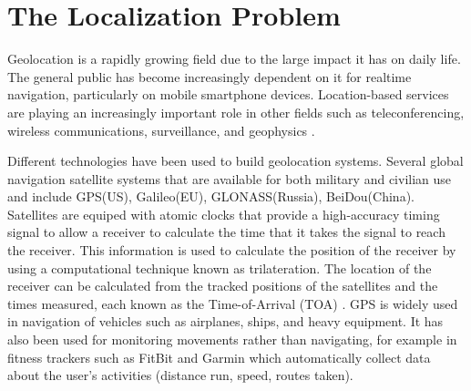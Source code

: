 \label{chapter:introduction}



\section{The Localization Problem} \label{problem}

Geolocation is a rapidly growing field due to the large impact it has on daily life.  The general public has become increasingly dependent on it for realtime navigation, particularly on mobile smartphone devices. Location-based services are  playing an increasingly important role in other fields such as teleconferencing, wireless communications, surveillance, and geophysics \cite{SmithAbel, ShcauRob, Yao, Huang, CheungChan, LiHu, Cheung, Sayed, classMDS}.

Different technologies have been used to build geolocation systems. Several global navigation satellite systems that are available for both military and civilian use and include GPS(US), Galileo(EU), GLONASS(Russia), BeiDou(China). Satellites are equiped with atomic clocks that provide a high-accuracy timing signal to  allow a receiver to calculate the time that it takes the signal to reach the receiver. This information is used to calculate the position of the receiver by using a  computational technique known as trilateration. The location of the receiver can be calculated from the
tracked positions of the satellites and the times measured, each known as the Time-of-Arrival (TOA) \cite{GeoLoc}.
%
 GPS is widely used in navigation of vehicles such as airplanes, ships, and heavy equipment. It has also been used for monitoring movements rather than navigating, for example in fitness trackers such as FitBit \cite{FB} and Garmin\cite{Garmin} which automatically collect data about the user's activities (distance run, speed, routes taken).
 


